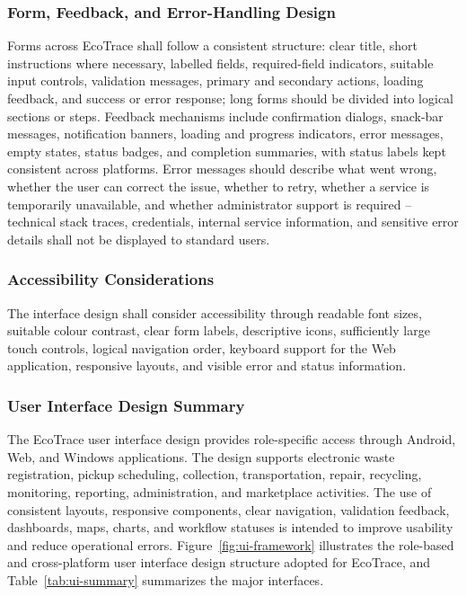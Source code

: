 \subsubsection{Form, Feedback, and Error-Handling Design}
Forms across EcoTrace shall follow a consistent structure: clear title, short
instructions where necessary, labelled fields, required-field indicators,
suitable input controls, validation messages, primary and secondary actions,
loading feedback, and success or error response; long forms should be divided
into logical sections or steps. Feedback mechanisms include confirmation
dialogs, snack-bar messages, notification banners, loading and progress
indicators, error messages, empty states, status badges, and completion
summaries, with status labels kept consistent across platforms. Error messages
should describe what went wrong, whether the user can correct the issue,
whether to retry, whether a service is temporarily unavailable, and whether
administrator support is required -- technical stack traces, credentials,
internal service information, and sensitive error details shall not be displayed
to standard users.

\subsubsection{Accessibility Considerations}
The interface design shall consider accessibility through readable font sizes,
suitable colour contrast, clear form labels, descriptive icons, sufficiently large
touch controls, logical navigation order, keyboard support for the Web
application, responsive layouts, and visible error and status information.

\subsubsection{User Interface Design Summary}
The EcoTrace user interface design provides role-specific access through
Android, Web, and Windows applications. The design supports electronic
waste registration, pickup scheduling, collection, transportation, repair,
recycling, monitoring, reporting, administration, and marketplace activities.
The use of consistent layouts, responsive components, clear navigation,
validation feedback, dashboards, maps, charts, and workflow statuses is
intended to improve usability and reduce operational errors.
Figure~\ref{fig:ui-framework} illustrates the role-based and cross-platform
user interface design structure adopted for EcoTrace, and
Table~\ref{tab:ui-summary} summarizes the major interfaces.

